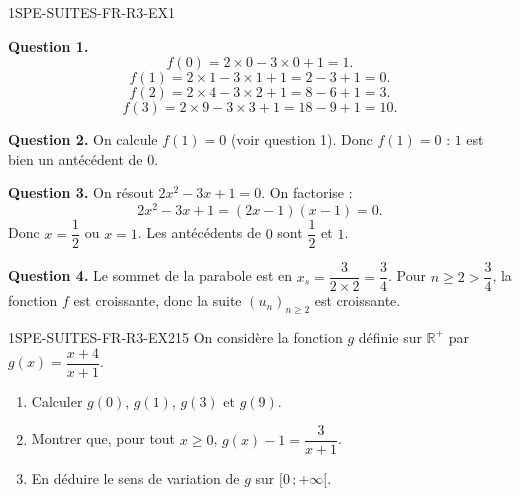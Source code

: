 
\begin{corrige}{1SPE-SUITES-FR-R3-EX1}


\textbf{Question 1.}
\[
f(0) = 2 \times 0 - 3 \times 0 + 1 = 1.
\]
\[
f(1) = 2 \times 1 - 3 \times 1 + 1 = 2 - 3 + 1 = 0.
\]
\[
f(2) = 2 \times 4 - 3 \times 2 + 1 = 8 - 6 + 1 = 3.
\]
\[
f(3) = 2 \times 9 - 3 \times 3 + 1 = 18 - 9 + 1 = 10.
\]


\textbf{Question 2.} On calcule $f(1) = 0$ (voir question 1). Donc $f(1) = 0$ : $1$ est bien un antécédent de $0$.

\textbf{Question 3.} On résout $2x^2 - 3x + 1 = 0$. On factorise :
\[
2x^2 - 3x + 1 = (2x - 1)(x - 1) = 0.
\]
Donc $x = \dfrac{1}{2}$ ou $x = 1$. Les antécédents de $0$ sont $\dfrac{1}{2}$ et $1$.


\textbf{Question 4.} Le sommet de la parabole est en $x_s = \dfrac{3}{2 \times 2} = \dfrac{3}{4}$. Pour $n \geq 2 > \dfrac{3}{4}$, la fonction $f$ est croissante, donc la suite $(u_n)_{n \geq 2}$ est croissante.

\end{corrige}


\begin{exercice}{1SPE-SUITES-FR-R3-EX2}{1}{5}
On considère la fonction $g$ définie sur $\mathbb{R}^+$ par $g(x) = \dfrac{x + 4}{x + 1}$.
\begin{enumerate}
  \item Calculer $g(0)$, $g(1)$, $g(3)$ et $g(9)$.
  \item Montrer que, pour tout $x \geq 0$, $g(x) - 1 = \dfrac{3}{x+1}$.
  \item En déduire le sens de variation de $g$ sur $[0\,;+\infty[$.
\end{enumerate}
\end{exercice}

